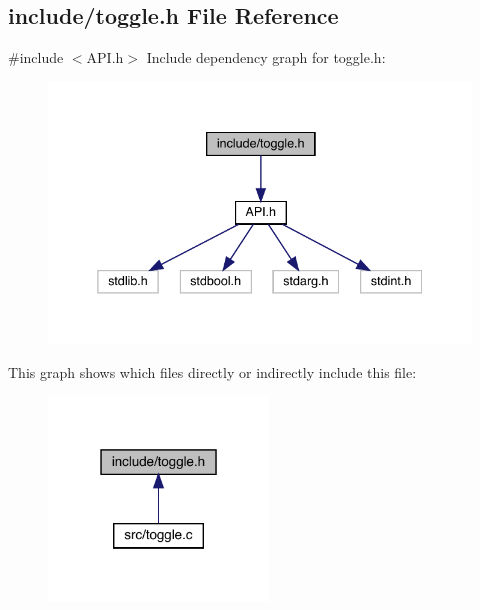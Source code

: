 \subsection{include/toggle.h File Reference}
\label{toggle_8h}
{\ttfamily \#include $<$A\+P\+I.\+h$>$}\newline
Include dependency graph for toggle.\+h\+:\nopagebreak
\begin{figure}[H]
\begin{center}
\leavevmode
\includegraphics[width=338pt]{toggle_8h__incl}
\end{center}
\end{figure}
This graph shows which files directly or indirectly include this file\+:\nopagebreak
\begin{figure}[H]
\begin{center}
\leavevmode
\includegraphics[width=166pt]{toggle_8h__dep__incl}
\end{center}
\end{figure}
